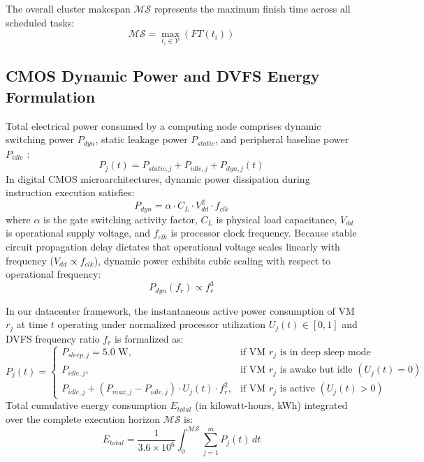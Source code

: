 \documentclass[default,sn-mathphys-num]{sn-jnl}
\theoremstyle{thmstyleone}
\theoremstyle{thmstyletwo}
\theoremstyle{thmstylethree}
\begin{document}
The overall cluster makespan $\mathcal{MS}$ represents the maximum finish time across all scheduled tasks:
\begin{equation}\label{eq:makespan}
\mathcal{MS} = \max_{t_i \in \mathcal{V}} \left( FT(t_i) \right)
\end{equation}

\subsection{CMOS Dynamic Power and DVFS Energy Formulation}
Total electrical power consumed by a computing node comprises dynamic switching power $P_{dyn}$, static leakage power $P_{static}$, and peripheral baseline power $P_{idle}$ \cite{devaraju2022dvfs}:
\begin{equation}
P_j(t) = P_{static, j} + P_{idle, j} + P_{dyn, j}(t)
\end{equation}
In digital CMOS microarchitectures, dynamic power dissipation during instruction execution satisfies:
\begin{equation}
P_{dyn} = \alpha \cdot C_L \cdot V_{dd}^2 \cdot f_{clk}
\end{equation}
where $\alpha$ is the gate switching activity factor, $C_L$ is physical load capacitance, $V_{dd}$ is operational supply voltage, and $f_{clk}$ is processor clock frequency. Because stable circuit propagation delay dictates that operational voltage scales linearly with frequency ($V_{dd} \propto f_{clk}$), dynamic power exhibits cubic scaling with respect to operational frequency:
\begin{equation}\label{eq:cubic_power}
P_{dyn}(f_r) \propto f_r^3
\end{equation}

In our datacenter framework, the instantaneous active power consumption of VM $r_j$ at time $t$ operating under normalized processor utilization $U_j(t) \in [0, 1]$ and DVFS frequency ratio $f_r$ is formalized as:
\begin{equation}\label{eq:inst_power}
P_j(t) = 
\begin{cases}
P_{sleep, j} = 5.0\text{ W}, & \text{if VM } r_j \text{ is in deep sleep mode} \\
P_{idle, j}, & \text{if VM } r_j \text{ is awake but idle } (U_j(t) = 0) \\
P_{idle, j} + \left( P_{max, j} - P_{idle, j} \right) \cdot U_j(t) \cdot f_r^2, & \text{if VM } r_j \text{ is active } (U_j(t) > 0)
\end{cases}
\end{equation}
Total cumulative energy consumption $E_{total}$ (in kilowatt-hours, kWh) integrated over the complete execution horizon $\mathcal{MS}$ is:
\begin{equation}\label{eq:energy_integral}
E_{total} = \frac{1}{3.6 \times 10^6} \int_{0}^{\mathcal{MS}} \sum_{j=1}^{m} P_j(t) \, dt
\end{equation}
\end{document}
